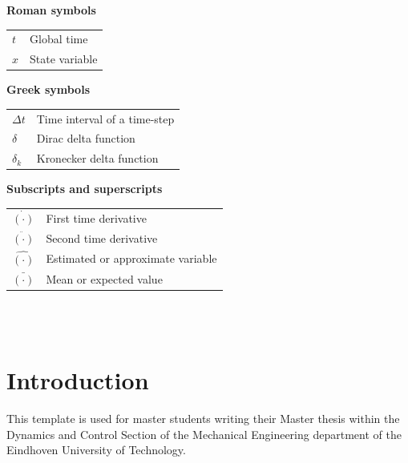\documentclass[11pt]{report}
\numberwithin{equation}{chapter}		%
\numberwithin{figure}{chapter}			%
\numberwithin{table}{chapter}			%
\begin{document}
\vspace{0.5cm}
\noindent\textbf{Roman symbols}\\[3mm]
\begin{tabularx}{\textwidth}{p{2.5cm}X}
	$t$             & Global time                                       \\
	$x$             & State variable                                    
\end{tabularx}

\vspace{0.5cm}
\noindent\textbf{Greek symbols}\\[3mm]
\begin{tabularx}{\textwidth}{p{2.5cm}X}
	$\Delta t$         & Time interval of a time-step                   \\
	$\delta$           & Dirac delta function                           \\
	$\delta_k$         & Kronecker delta function                       
\end{tabularx}

\vspace{0.5cm}
\noindent\textbf{Subscripts and superscripts}\\[3mm]
\begin{tabularx}{\textwidth}{p{2.5cm}X}
	$\dot{(\cdot)}$    & First time derivative                          \\
	$\ddot{(\cdot)}$   & Second time derivative                         \\
	$\hat{(\cdot)}$    & Estimated or approximate variable              \\
	$\bar{(\cdot)}$    & Mean or expected value                         
\end{tabularx}\\


\newpage
\thispagestyle{empty} \ \newpage

\chapter{Introduction} \label{ch:Intro}
This template is used for master students writing their Master thesis within the Dynamics and Control Section of the Mechanical Engineering department of the Eindhoven University of Technology. 
\end{document}
